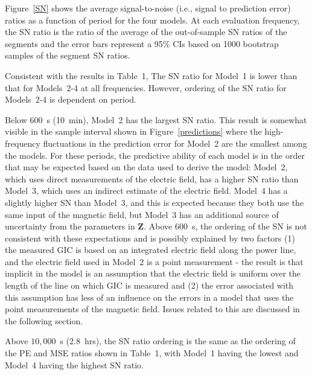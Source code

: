 \documentclass[draft,linenumbers]{agujournal2018}
\begin{document}

Figure~\ref{SN} shows the average signal-to-noise (i.e., signal to prediction error) ratios as a function of period for the four models. At each evaluation frequency, the SN ratio is the ratio of the average of the out-of-sample SN ratios of the segments and the error bars represent a 95\% CIs based on 1000 bootstrap samples of the segment SN ratios. 

Consistent with the results in Table~1, The SN ratio for Model~1 is lower than that for Models~2-4 at all frequencies. However, ordering of the SN ratio for Models~2-4 is dependent on period. 

Below $600$~s (10~min), Model~2 has the largest SN ratio. This result is somewhat visible in the sample interval shown in Figure~\ref{predictions} where the high-frequency fluctuations in the prediction error for Model~2 are the smallest among the models. For these periods, the predictive ability of each model is in the order that may be expected based on the data used to derive the model: Model~2, which uses direct measurements of the electric field, has a higher SN ratio than Model~3, which uses an indirect estimate of the electric field. Model~4 has a slightly higher SN than Model~3, and this is expected because they both use the same input of the magnetic field, but Model~3 has an additional source of uncertainty from the parameters in $\mathbf{Z}$. Above $600$~s, the ordering of the SN is not consistent with these expectations and is possibly explained by two factors (1) the measured GIC is based on an integrated electric field along the power line, and the electric field used in Model~2 is a point measurement - the result is that implicit in the model is an assumption that the electric field is uniform over the length of the line on which GIC is measured and (2) the error associated with this assumption has less of an influence on the errors in a model that uses the point measurements of the magnetic field. Issues related to this are discussed in the following section.

Above $10,000$~s (2.8~hrs), the SN ratio ordering is the same as the ordering of the PE and MSE ratios shown in Table~1, with Model~1 having the lowest and Model~4 having the highest SN ratio. 
\end{document}
